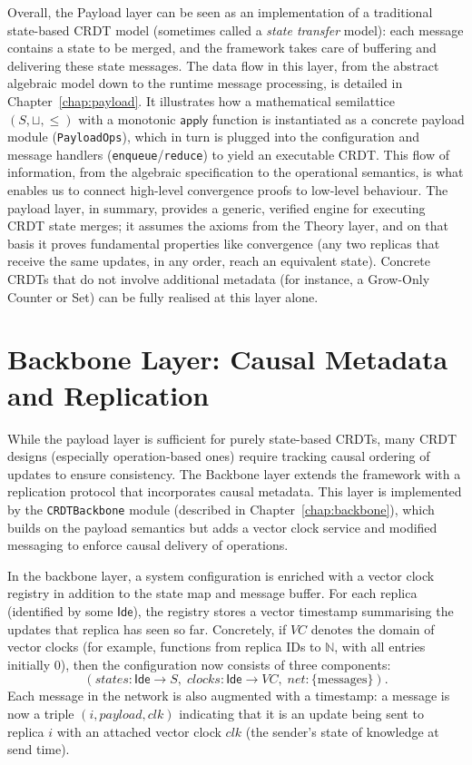Overall, the Payload layer can be seen as an implementation of a traditional state-based CRDT model (sometimes called a \emph{state transfer} model): each message contains a state to be merged, and the framework takes care of buffering and delivering these state messages. The data flow in this layer, from the abstract algebraic model down to the runtime message processing, is detailed in Chapter~\ref{chap:payload}. It illustrates how a mathematical semilattice $(S,\sqcup,\leq)$ with a monotonic $\mathsf{apply}$ function is instantiated as a concrete payload module (\texttt{PayloadOps}), which in turn is plugged into the configuration and message handlers (\texttt{enqueue}/\texttt{reduce}) to yield an executable CRDT. This flow of information, from the algebraic specification to the operational semantics, is what enables us to connect high-level convergence proofs to low-level behaviour. The payload layer, in summary, provides a generic, verified engine for executing CRDT state merges; it assumes the axioms from the Theory layer, and on that basis it proves fundamental properties like convergence (any two replicas that receive the same updates, in any order, reach an equivalent state). Concrete CRDTs that do not involve additional metadata (for instance, a Grow-Only Counter or Set) can be fully realised at this layer alone.

\section{Backbone Layer: Causal Metadata and Replication}
\label{sec:framework-backbone}

While the payload layer is sufficient for purely state-based CRDTs, many CRDT designs (especially operation-based ones) require tracking causal ordering of updates to ensure consistency. The Backbone layer extends the framework with a replication protocol that incorporates causal metadata. This layer is implemented by the \texttt{CRDTBackbone} module (described in Chapter~\ref{chap:backbone}), which builds on the payload semantics but adds a vector clock service and modified messaging to enforce causal delivery of operations.

In the backbone layer, a system configuration is enriched with a vector clock registry in addition to the state map and message buffer. For each replica (identified by some $\mathsf{Ide}$), the registry stores a vector timestamp summarising the updates that replica has seen so far. Concretely, if $VC$ denotes the domain of vector clocks (for example, functions from replica IDs to $\mathbb{N}$, with all entries initially $0$), then the configuration now consists of three components:
\[
  (\mathit{states}: \mathsf{Ide}\to S,\;
   \mathit{clocks}: \mathsf{Ide}\to VC,\;
   \mathit{net}: \{\text{messages}\}).
\]
Each message in the network is also augmented with a timestamp: a message is now a triple $(i, \mathit{payload}, clk)$ indicating that it is an update being sent to replica $i$ with an attached vector clock $clk$ (the sender’s state of knowledge at send time).

